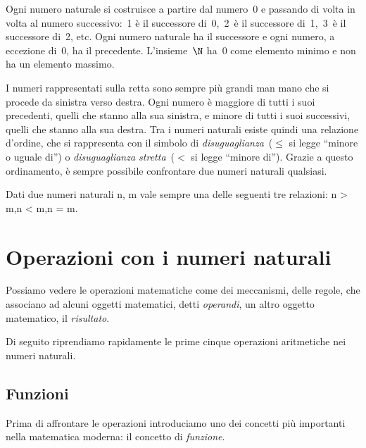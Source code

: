 \begin{inaccessibleblock}
\begin{center}
 
\end{center}
\end{inaccessibleblock}

Ogni numero naturale si costruisce a partire dal numero~0 e passando di 
volta in volta al numero successivo:~1 è il successore di~0,~2~è il 
successore di~1,~3~è il successore di~2, etc. 
Ogni numero naturale ha il successore e ogni numero, a eccezione di~0, ha il
precedente. 
L'insieme~\(\N\) ha~0 come elemento minimo e non ha un elemento massimo.

I numeri rappresentati sulla retta sono sempre più grandi man mano che si 
procede da sinistra verso destra. 
Ogni numero è maggiore di tutti i suoi precedenti, quelli che stanno alla 
sua sinistra, e minore di tutti i suoi successivi, quelli che stanno alla 
sua destra. 
Tra i numeri naturali esiste quindi una relazione d'ordine, che si 
rappresenta con il simbolo di 
\emph{disuguaglianza}~(\(\le\) si legge ``minore o uguale di'') o 
\emph{disuguaglianza stretta}~(\(<\) si legge ``minore di'').
Grazie a questo ordinamento, è sempre possibile confrontare due numeri 
naturali qualsiasi.

\begin{legge}[di tricotomia]
Dati due numeri naturali n, m vale sempre una delle seguenti tre relazioni: 
\quad n > m,\quad n < m,\quad n = m.
\end{legge}

\section{Operazioni con i numeri naturali}
\label{sec:01_operazioni}

Possiamo vedere le operazioni matematiche come dei meccanismi, delle regole, 
che associano ad alcuni oggetti matematici, detti \emph{operandi}, 
un altro oggetto matematico, il \emph{risultato}.

Di seguito riprendiamo rapidamente le prime cinque operazioni aritmetiche 
nei numeri naturali. 

\subsection{Funzioni}

Prima di affrontare le operazioni introduciamo uno dei concetti più importanti
nella matematica moderna: il concetto di \emph{funzione}.

